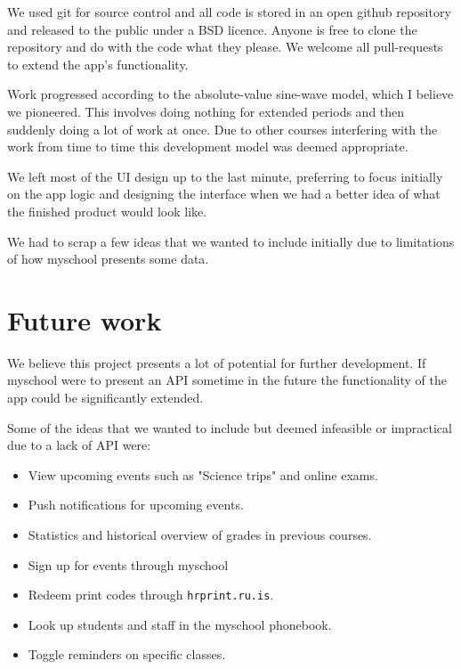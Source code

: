 \documentclass[pdftex, DIV=calc, paper=a4, fontsize=11pt, twocolumn]{scrartcl}	 %
\begin{document}
We used git for source control and all code is stored in an open github repository and released
to the public under a BSD licence. Anyone is free to clone the repository and do with the code what
they please. We welcome all pull-requests to extend the app's functionality.

Work progressed according to the absolute-value sine-wave model, which I believe we pioneered. This 
involves doing nothing for extended periods and then suddenly doing a lot of work at once. Due to 
other courses interfering with the work from time to time this development model was deemed 
appropriate.

We left most of the UI design up to the last minute, preferring to focus initially on the app logic
and designing the interface when we had a better idea of what the finished product would look like.

We had to scrap a few ideas that we wanted to include initially due to limitations of how myschool
presents some data.


\section*{Future work}

We believe this project presents a lot of potential for further development. If myschool were to
present an API sometime in the future the functionality of the app could be significantly extended.

Some of the ideas that we wanted to include but deemed infeasible or impractical due to a lack
of API were:

\begin{itemize}
    \item View upcoming events such as "Science trips" and online exams.
    \item Push notifications for upcoming events.
    \item Statistics and historical overview of grades in previous courses.
    \item Sign up for events through myschool
    \item Redeem print codes through \texttt{hrprint.ru.is}.
    \item Look up students and staff in the myschool phonebook.
    \item Toggle reminders on specific classes.
\end{itemize}
\end{document}
